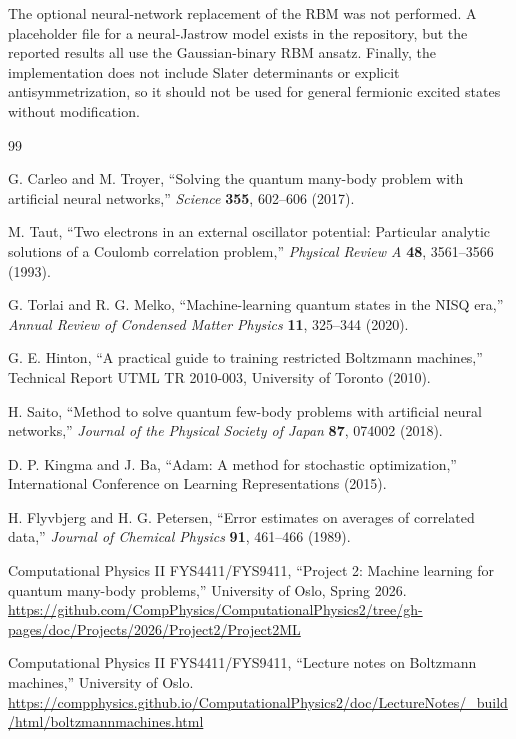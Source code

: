 \documentclass[10pt,a4paper]{article}
\begin{document}
The optional neural-network replacement of the RBM was not performed. A placeholder file for a neural-Jastrow model exists in the repository, but the reported results all use the Gaussian-binary RBM ansatz. Finally, the implementation does not include Slater determinants or explicit antisymmetrization, so it should not be used for general fermionic excited states without modification.

\begin{thebibliography}{99}

G. Carleo and M. Troyer,
``Solving the quantum many-body problem with artificial neural networks,''
\emph{Science} \textbf{355}, 602--606 (2017).

M. Taut,
``Two electrons in an external oscillator potential: Particular analytic solutions of a Coulomb correlation problem,''
\emph{Physical Review A} \textbf{48}, 3561--3566 (1993).

G. Torlai and R. G. Melko,
``Machine-learning quantum states in the NISQ era,''
\emph{Annual Review of Condensed Matter Physics} \textbf{11}, 325--344 (2020).

G. E. Hinton,
``A practical guide to training restricted Boltzmann machines,''
Technical Report UTML TR 2010-003, University of Toronto (2010).

H. Saito,
``Method to solve quantum few-body problems with artificial neural networks,''
\emph{Journal of the Physical Society of Japan} \textbf{87}, 074002 (2018).

D. P. Kingma and J. Ba,
``Adam: A method for stochastic optimization,''
International Conference on Learning Representations (2015).

H. Flyvbjerg and H. G. Petersen,
``Error estimates on averages of correlated data,''
\emph{Journal of Chemical Physics} \textbf{91}, 461--466 (1989).

Computational Physics II FYS4411/FYS9411,
``Project 2: Machine learning for quantum many-body problems,''
University of Oslo, Spring 2026.
\url{https://github.com/CompPhysics/ComputationalPhysics2/tree/gh-pages/doc/Projects/2026/Project2/Project2ML}

Computational Physics II FYS4411/FYS9411,
``Lecture notes on Boltzmann machines,''
University of Oslo.
\url{https://compphysics.github.io/ComputationalPhysics2/doc/LectureNotes/_build/html/boltzmannmachines.html}

\end{thebibliography}
\end{document}
